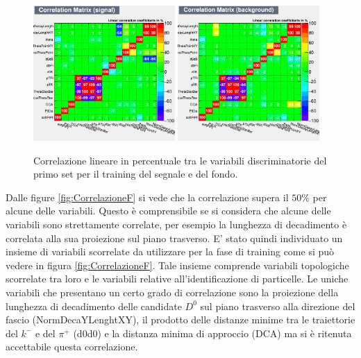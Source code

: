    
    \begin{figure}
       \centering
       \includegraphics[width=0.48\textwidth]{training&testing/CorrelationMatrixSin.png}
        \includegraphics[width=0.48\textwidth]{training&testing/CorrelationMatrixBin.png}
       \caption{Correlazione lineare in percentuale tra le variabili discriminatorie del primo set per il training del segnale e del fondo.}
       \label{fig:correlazioneIn}
   \end{figure} 
    
 
    
    Dalle figure \ref{fig:CorrelazioneF} si vede che la correlazione supera il $50 \%$ per alcune delle variabili. Questo \`e comprensibile se si considera che alcune delle variabili sono strettamente correlate, per esempio la lunghezza di decadimento \`e correlata alla sua proiezione sul piano trasverso. E' stato quindi individuato un insieme di variabili scorrelate da utilizzare per la fase di training come si pu\`o vedere in figura \ref{fig:CorrelazioneF}. Tale insieme comprende variabili topologiche scorrelate tra loro e le variabili relative all'identificazione di particelle. Le uniche variabili che presentano un certo grado di correlazione sono la proiezione della lunghezza di decadimento delle candidate $D^0$ sul piano trasverso alla direzione del fascio (NormDecaYLenghtXY), il prodotto delle distanze minime tra le traiettorie del $k^-$ e del $\pi^+$ (d0d0) e la distanza minima di approccio (DCA) ma si è ritenuta accettabile questa correlazione. 
 
